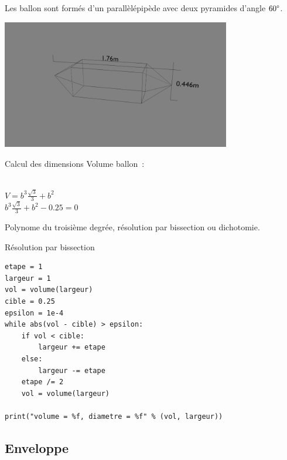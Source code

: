 \documentclass{beamer}
\begin{document}
\begin{frame}
  Les ballon sont formés d'un parallèlépipède avec deux pyramides d'angle $60\degree$. \\
  \begin{center}
    \includegraphics[width=10cm]{../Images/ballon.png}
  \end{center}
\end{frame}

\begin{frame}{Calcul des dimensions}
  Volume ballon~:
  \begin{center}
     \\
    $\displaystyle{V = b^3 \frac{\sqrt{3}}{3} + b^2}$ \\
    $\displaystyle{b^3 \frac{\sqrt{3}}{3} + b^2 - 0.25 = 0}$
  \end{center}
  Polynome du troisième degrée, résolution par bissection ou dichotomie.
\end{frame}

\begin{frame}[fragile]{Résolution par bissection}
  \begin{lstlisting}[frame=single]
etape = 1
largeur = 1
vol = volume(largeur)
cible = 0.25
epsilon = 1e-4
while abs(vol - cible) > epsilon:
	if vol < cible:
		largeur += etape
	else:
		largeur -= etape
	etape /= 2
	vol = volume(largeur)

print("volume = %f, diametre = %f" % (vol, largeur))
  \end{lstlisting}
\end{frame}

\subsection{Enveloppe}
\end{document}

